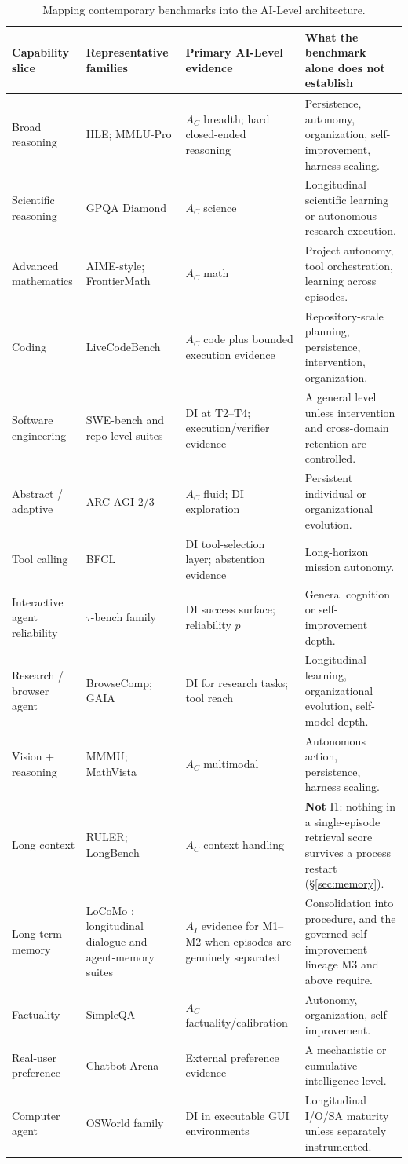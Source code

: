 \begin{table}[!htbp]
\centering\scriptsize
\begin{tabularx}{\textwidth}{@{}lZZZ@{}}
\toprule
Capability slice & Representative families & Primary AI-Level evidence & What the benchmark alone does not establish \\
\midrule
Broad reasoning & HLE; MMLU-Pro & $A_C$ breadth; hard closed-ended reasoning & Persistence, autonomy, organization, self-improvement, harness scaling. \\
Scientific reasoning & GPQA Diamond & $A_C$ science & Longitudinal scientific learning or autonomous research execution. \\
Advanced mathematics & AIME-style; FrontierMath & $A_C$ math & Project autonomy, tool orchestration, learning across episodes. \\
Coding & LiveCodeBench & $A_C$ code plus bounded execution evidence & Repository-scale planning, persistence, intervention, organization. \\
Software engineering & SWE-bench and repo-level suites & DI at T2--T4; execution/verifier evidence & A general level unless intervention and cross-domain retention are controlled. \\
Abstract / adaptive & ARC-AGI-2/3 & $A_C$ fluid; DI exploration & Persistent individual or organizational evolution. \\
Tool calling & BFCL & DI tool-selection layer; abstention evidence & Long-horizon mission autonomy. \\
Interactive agent reliability & $\tau$-bench family & DI success surface; reliability $p$ & General cognition or self-improvement depth. \\
Research / browser agent & BrowseComp; GAIA & DI for research tasks; tool reach & Longitudinal learning, organizational evolution, self-model depth. \\
Vision + reasoning & MMMU; MathVista & $A_C$ multimodal & Autonomous action, persistence, harness scaling. \\
Long context & RULER; LongBench & $A_C$ context handling & \textbf{Not} I1: nothing in a single-episode retrieval score survives a process restart (\S\ref{sec:memory}). \\
Long-term memory & LoCoMo \citep{maharana2024locomo}; longitudinal dialogue and agent-memory suites & $A_I$ evidence for M1--M2 when episodes are genuinely separated & Consolidation into procedure, and the governed self-improvement lineage M3 and above require. \\
Factuality & SimpleQA & $A_C$ factuality/calibration & Autonomy, organization, self-improvement. \\
Real-user preference & Chatbot Arena & External preference evidence & A mechanistic or cumulative intelligence level. \\
Computer agent & OSWorld family & DI in executable GUI environments & Longitudinal I/O/SA maturity unless separately instrumented. \\
\bottomrule
\end{tabularx}
\caption{Mapping contemporary benchmarks into the AI-Level architecture.}
\label{tab:mapping}
\end{table}

